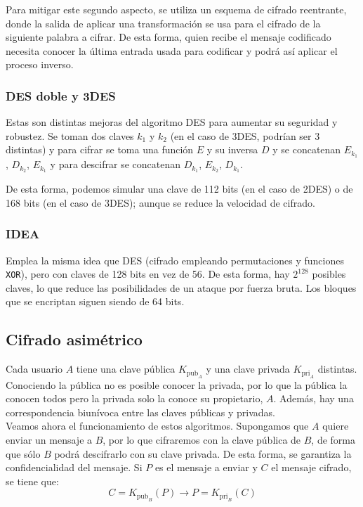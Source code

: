 Para mitigar este segundo aspecto, se utiliza un esquema de cifrado reentrante, donde la salida de aplicar una transformación se usa para el cifrado de la siguiente palabra a cifrar. De esta forma, quien recibe el mensaje codificado necesita conocer la última entrada usada para codificar y podrá así aplicar el proceso inverso.

\subsubsection{\acrshort{DES} doble y 3\acrshort{DES}}

Estas son distintas mejoras del algoritmo \acrshort{DES} para aumentar su seguridad y robustez. Se toman dos claves $k_1$ y $k_2$ (en el caso de 3\acrshort{DES}, podrían ser 3 distintas) y para cifrar se toma una función $E$ y su inversa $D$ y se concatenan $E_{k_1}$, $D_{k_2}$, $E_{k_1}$ y para descifrar se concatenan $D_{k_1}$, $E_{k_2}$, $D_{k_1}$.

De esta forma, podemos simular una clave de 112 bits (en el caso de 2\acrshort{DES}) o de 168 bits (en el caso de 3\acrshort{DES}); aunque se reduce la velocidad de cifrado.
\subsubsection{\acrfull{IDEA}}

Emplea la misma idea que \acrshort{DES} (cifrado empleando permutaciones y funciones \verb|XOR|), pero con claves de 128 bits en vez de 56. De esta forma, hay $2^{128}$ posibles claves, lo que reduce las posibilidades de un ataque por fuerza bruta. Los bloques que se encriptan siguen siendo de 64 bits.

\subsection{Cifrado asimétrico}
Cada usuario $A$ tiene una clave pública $K_{\text{pub}_A}$ y una clave privada $K_{\text{pri}_A}$ distintas. Conociendo la pública no es posible conocer la privada, por lo que la pública la conocen todos pero la privada solo la conoce su propietario, $A$.  Además, hay una correspondencia biunívoca entre las claves públicas y privadas.\\

Veamos ahora el funcionamiento de estos algoritmos. Supongamos que $A$ quiere enviar un mensaje a $B$, por lo que cifraremos con la clave pública de $B$, de forma que sólo $B$ podrá descifrarlo con su clave privada. De esta forma, se garantiza la confidencialidad del mensaje. Si $P$ es el mensaje a enviar y $C$ el mensaje cifrado, se tiene que:
\begin{equation*}
    C = K_{\text{pub}_B}(P) \longrightarrow P = K_{\text{pri}_B}(C)
\end{equation*}

